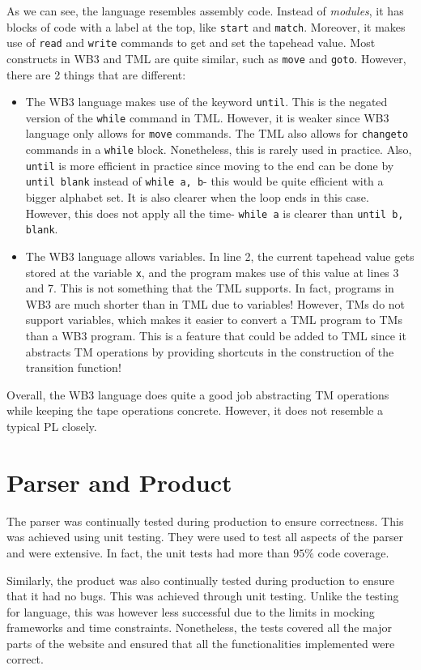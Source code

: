 As we can see, the language resembles assembly code. Instead of \textit{modules}, it has blocks of code with a label at the top, like \texttt{start} and \texttt{match}. Moreover, it makes use of \texttt{read} and \texttt{write} commands to get and set the tapehead value. Most constructs in WB3 and TML are quite similar, such as \texttt{move} and \texttt{goto}. However, there are 2 things that are different:
\begin{itemize}
    \item The WB3 language makes use of the keyword \texttt{until}. This is the negated version of the \texttt{while} command in TML. However, it is weaker since WB3 language only allows for \texttt{move} commands. The TML also allows for \texttt{changeto} commands in a \texttt{while} block. Nonetheless, this is rarely used in practice. Also, \texttt{until} is more efficient in practice since moving to the end can be done by \texttt{until blank} instead of \texttt{while a, b}- this would be quite efficient with a bigger alphabet set. It is also clearer when the loop ends in this case. However, this does not apply all the time- \texttt{while a} is clearer than \texttt{until b, blank}.
    
    \item The WB3 language allows variables. In line 2, the current tapehead value gets stored at the variable \texttt{x}, and the program makes use of this value at lines 3 and 7. This is not something that the TML supports. In fact, programs in WB3 are much shorter than in TML due to variables! However, TMs do not support variables, which makes it easier to convert a TML program to TMs than a WB3 program. This is a feature that could be added to TML since it abstracts TM operations by providing shortcuts in the construction of the transition function!
\end{itemize}
Overall, the WB3 language does quite a good job abstracting TM operations while keeping the tape operations concrete. However, it does not resemble a typical PL closely.

\section{Parser and Product}
The parser was continually tested during production to ensure correctness. This was achieved using unit testing. They were used to test all aspects of the parser and were extensive. In fact, the unit tests had more than $95\%$ code coverage.

Similarly, the product was also continually tested during production to ensure that it had no bugs. This was achieved through unit testing. Unlike the testing for language, this was however less successful due to the limits in mocking frameworks and time constraints. Nonetheless, the tests covered all the major parts of the website and ensured that all the functionalities implemented were correct. 

